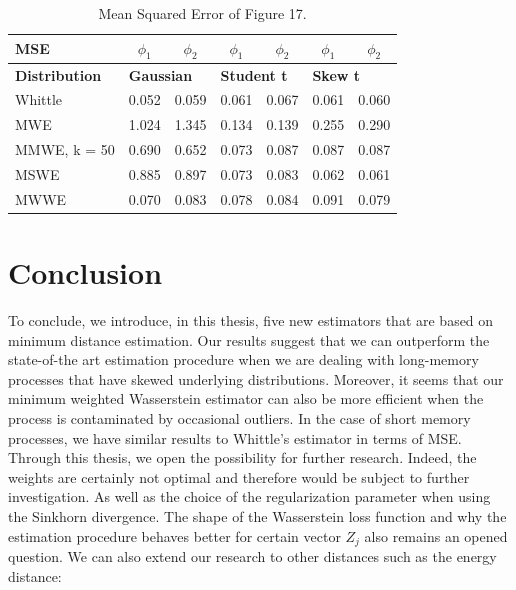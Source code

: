 \documentclass[
  11pt,
]{article}
\begin{document}
\begin{table}[h]
\centering
\begin{tabular}{|l|c|c|c|c|c|c|}
\hline
\textbf{MSE}          & $\phi_1$           & $\phi_2$          & $\phi_1$           & $\phi_2$           & $\phi_1$          & $\phi_2$         \\ \hline
\textbf{Distribution} & \multicolumn{2}{l|}{\textbf{Gaussian}} & \multicolumn{2}{l|}{\textbf{Student t}} & \multicolumn{2}{l|}{\textbf{Skew t}} \\ \hline
Whittle               & 0.052              & 0.059             & 0.061              & 0.067              & 0.061             & 0.060            \\ \hline
MWE                   & 1.024              & 1.345             & 0.134              & 0.139              & 0.255             & 0.290            \\ \hline
MMWE, k = 50          & 0.690              & 0.652             & 0.073              & 0.087              & 0.087             & 0.087            \\ \hline
MSWE                  & 0.885              & 0.897             & 0.073              & 0.083              & 0.062             & 0.061            \\ \hline
MWWE                  & 0.070              & 0.083             & 0.078              & 0.084              & 0.091             & 0.079            \\ \hline
\end{tabular}
\caption{Mean Squared Error of Figure 17.}
\label{tab:AR2_mse_table}
\end{table}

\hypertarget{conclusion}{%
\section{Conclusion}\label{conclusion}}

To conclude, we introduce, in this thesis, five new estimators that are
based on minimum distance estimation. Our results suggest that we can
outperform the state-of-the art estimation procedure when we are dealing
with long-memory processes that have skewed underlying distributions.
Moreover, it seems that our minimum weighted Wasserstein estimator can
also be more efficient when the process is contaminated by occasional
outliers. In the case of short memory processes, we have similar results
to Whittle's estimator in terms of MSE. Through this thesis, we open the
possibility for further research. Indeed, the weights are certainly not
optimal and therefore would be subject to further investigation. As well
as the choice of the regularization parameter when using the Sinkhorn
divergence. The shape of the Wasserstein loss function and why the
estimation procedure behaves better for certain vector \(Z_j\) also
remains an opened question. We can also extend our research to other
distances such as the energy distance:
\end{document}
